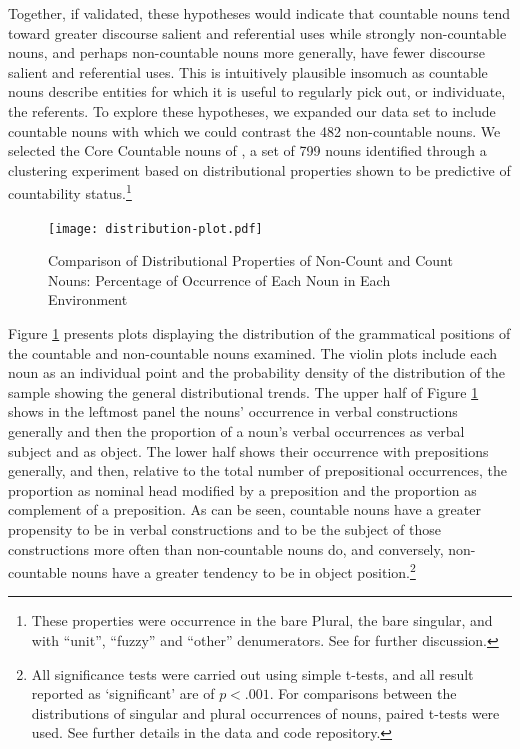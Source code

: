 \documentclass[output=paper]{langscibook}
\begin{document}
Together, if validated, these hypotheses would indicate that countable nouns tend toward greater discourse salient and referential uses while strongly non-countable nouns, and perhaps non-countable nouns more generally, have fewer discourse salient and referential uses.  This is intuitively plausible insomuch as countable nouns describe entities for which it is useful to regularly pick out, or individuate, the referents.  To explore these hypotheses, we expanded our data set to include countable nouns with which we could contrast the 482 non-countable nouns.  We selected the Core Countable nouns of \citet{GrimmWahlang2020}, a set of 799 nouns identified through a clustering experiment based on distributional properties shown to be predictive of countability status.\footnote{These properties were occurrence in the bare Plural, the bare singular, and with ``unit'', ``fuzzy'' and ``other'' denumerators.  See \citet{GrimmWahlang2020} for further discussion.}

\begin{figure}
    \centering
    \texttt{[image: distribution-plot.pdf]}
    \caption{Comparison of Distributional Properties of Non-Count and Count Nouns: Percentage of Occurrence of Each Noun in  Each Environment}
    \label{gri-ric:fig:distribution}
\end{figure}

Figure \ref{gri-ric:fig:distribution} presents plots displaying the distribution of the grammatical positions of the countable and non-countable nouns examined.  The violin plots include each noun as an individual point and the probability density of the distribution of the sample showing the general distributional trends. The upper half of Figure \ref{gri-ric:fig:distribution} shows in the leftmost panel the nouns' occurrence in verbal constructions generally and then the proportion of a noun's verbal occurrences  as verbal subject and as object.  The lower half shows their occurrence with prepositions generally, and then, relative to the total number of prepositional occurrences, the proportion as nominal head modified by a preposition and the proportion as complement of a preposition.  As can be seen, countable nouns have a greater propensity to be in verbal constructions and to be the subject of those constructions more often than non-countable nouns do, and conversely, non-countable nouns have a greater tendency to be in object position.\footnote{All significance tests were carried out using simple t-tests, and all result reported as `significant' are of $p<.001$. For comparisons between the distributions of singular and plural occurrences of nouns, paired t-tests were used. See further details in the data and code repository.}
\end{document}
